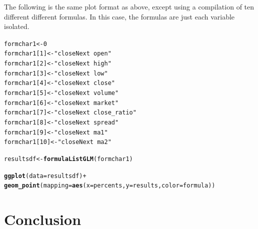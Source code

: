 \documentclass{article}\usepackage[]{graphicx}\usepackage[]{color}
\makeatletter
\newcommand{\hlnum}[1]{\textcolor[rgb]{0.686,0.059,0.569}{#1}}%
\newcommand{\hlstr}[1]{\textcolor[rgb]{0.192,0.494,0.8}{#1}}%
\newcommand{\hlopt}[1]{\textcolor[rgb]{0,0,0}{#1}}%
\newcommand{\hlstd}[1]{\textcolor[rgb]{0.345,0.345,0.345}{#1}}%
\newcommand{\hlkwb}[1]{\textcolor[rgb]{0.69,0.353,0.396}{#1}}%
\newcommand{\hlkwc}[1]{\textcolor[rgb]{0.333,0.667,0.333}{#1}}%
\newcommand{\hlkwd}[1]{\textcolor[rgb]{0.737,0.353,0.396}{\textbf{#1}}}%
\newenvironment{kframe}{%
 \def\at@end@of@kframe{}%
 \ifinner\ifhmode%
  \def\at@end@of@kframe{\end{minipage}}%
  \begin{minipage}{\columnwidth}%
 \fi\fi%
 \def\FrameCommand##1{\hskip\@totalleftmargin \hskip-\fboxsep
 \colorbox{shadecolor}{##1}\hskip-\fboxsep
     \hskip-\linewidth \hskip-\@totalleftmargin \hskip\columnwidth}%
 \MakeFramed {\advance\hsize-\width
   \@totalleftmargin\z@ \linewidth\hsize
   \@setminipage}}%
 {\par\unskip\endMakeFramed%
 \at@end@of@kframe}
\newenvironment{knitrout}{}{} %
\makeatother
\begin{document}
The following is the same plot format as above, except using a compilation of ten different different formulas. In this case, the formulas are just each variable isolated.
\begin{knitrout}
\color{fgcolor}\begin{kframe}
\begin{alltt}
  \hlstd{formchar1}    \hlkwb{<-} \hlnum{0}
  \hlstd{formchar1[}\hlnum{1}\hlstd{]} \hlkwb{<-} \hlstr{"closeNext~open"}
  \hlstd{formchar1[}\hlnum{2}\hlstd{]} \hlkwb{<-} \hlstr{"closeNext~high"}
  \hlstd{formchar1[}\hlnum{3}\hlstd{]} \hlkwb{<-} \hlstr{"closeNext~low"}
  \hlstd{formchar1[}\hlnum{4}\hlstd{]} \hlkwb{<-} \hlstr{"closeNext~close"}
  \hlstd{formchar1[}\hlnum{5}\hlstd{]} \hlkwb{<-} \hlstr{"closeNext~volume"}
  \hlstd{formchar1[}\hlnum{6}\hlstd{]} \hlkwb{<-} \hlstr{"closeNext~market"}
  \hlstd{formchar1[}\hlnum{7}\hlstd{]} \hlkwb{<-} \hlstr{"closeNext~close_ratio"}
  \hlstd{formchar1[}\hlnum{8}\hlstd{]} \hlkwb{<-} \hlstr{"closeNext~spread"}
  \hlstd{formchar1[}\hlnum{9}\hlstd{]} \hlkwb{<-} \hlstr{"closeNext~ma1"}
  \hlstd{formchar1[}\hlnum{10}\hlstd{]}\hlkwb{<-} \hlstr{"closeNext~ma2"}

\hlstd{resultsdf} \hlkwb{<-} \hlkwd{formulaListGLM}\hlstd{(formchar1)}
\end{alltt}
\end{kframe}
\end{knitrout}

\begin{center}
\begin{knitrout}
\color{fgcolor}\begin{kframe}
\begin{alltt}
\hlkwd{ggplot}\hlstd{(}\hlkwc{data}\hlstd{=resultsdf)} \hlopt{+}
  \hlkwd{geom_point}\hlstd{(}\hlkwc{mapping} \hlstd{=} \hlkwd{aes}\hlstd{(}\hlkwc{x}\hlstd{=percents,}\hlkwc{y}\hlstd{=results,}\hlkwc{color}\hlstd{=formula))}
\end{alltt}
\end{kframe}
\end{knitrout}
\end{center}


\section{Conclusion}


\nocite{*}



\end{document}
